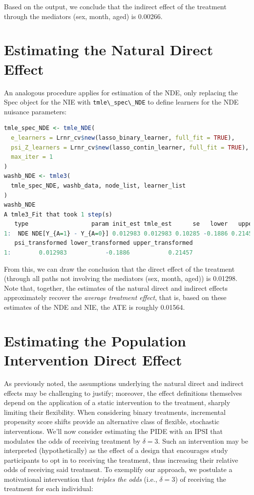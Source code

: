 \documentclass[12pt, krantz2,]{krantz}
\newcommand{\passthrough}[1]{#1}
\theoremstyle{definition}
\theoremstyle{definition}
\theoremstyle{definition}
\newcommand{\1}{\mathbbm{1}}
\begin{document}
Based on the output, we conclude that the indirect effect of the treatment
through the mediators (sex, month, aged) is
0.00266.

\hypertarget{estimating-the-natural-direct-effect}{%
\section{Estimating the Natural Direct Effect}\label{estimating-the-natural-direct-effect}}

An analogous procedure applies for estimation of the NDE, only replacing the
Spec object for the NIE with \passthrough{\lstinline!tmle\_spec\_NDE!} to define learners for the NDE
nuisance parameters:

\begin{lstlisting}[language=R]
tmle_spec_NDE <- tmle_NDE(
  e_learners = Lrnr_cv$new(lasso_binary_learner, full_fit = TRUE),
  psi_Z_learners = Lrnr_cv$new(lasso_contin_learner, full_fit = TRUE),
  max_iter = 1
)
washb_NDE <- tmle3(
  tmle_spec_NDE, washb_data, node_list, learner_list
)
washb_NDE
A tmle3_Fit that took 1 step(s)
   type                  param init_est tmle_est      se   lower   upper
1:  NDE NDE[Y_{A=1} - Y_{A=0}] 0.012983 0.012983 0.10285 -0.1886 0.21457
   psi_transformed lower_transformed upper_transformed
1:        0.012983           -0.1886           0.21457
\end{lstlisting}

From this, we can draw the conclusion that the direct effect of the treatment
(through all paths not involving the mediators (sex, month, aged)) is
0.01298. Note that, together, the estimates of
the natural direct and indirect effects approximately recover the \emph{average
treatment effect}, that is, based on these estimates of the NDE and NIE, the
ATE is roughly
0.01564.

\hypertarget{estimating-the-population-intervention-direct-effect}{%
\section{Estimating the Population Intervention Direct Effect}\label{estimating-the-population-intervention-direct-effect}}

As previously noted, the assumptions underlying the natural direct and indirect
effects may be challenging to justify; moreover, the effect definitions
themselves depend on the application of a static intervention to the treatment,
sharply limiting their flexibility. When considering binary treatments,
incremental propensity score shifts provide an alternative class of flexible,
stochastic interventions. We'll now consider estimating the PIDE with an IPSI
that modulates the odds of receiving treatment by \(\delta = 3\). Such an
intervention may be interpreted (hypothetically) as the effect of a design that
encourages study participants to opt in to receiving the treatment, thus
increasing their relative odds of receiving said treatment. To exemplify our
approach, we postulate a motivational intervention that \emph{triples the odds}
(i.e., \(\delta = 3\)) of receiving the treatment for each individual:
\end{document}
